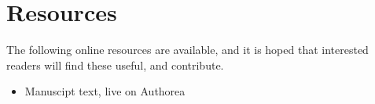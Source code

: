 \section{Resources}

The following online resources are available, and it is hoped that interested readers will find these useful, and contribute.

\begin{itemize}
\item Manuscipt text, live on Authorea
\end{itemize}